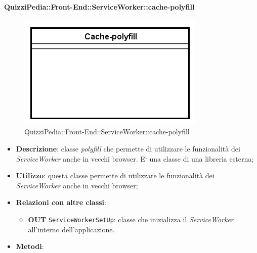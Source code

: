 \paragraph[QuizziPedia::Front-End::ServiceWorker::cache-polyfill]{QuizziPedia::Front-End::ServiceWorker::cache-polyfill}
\begin{figure} [ht]
	\centering
	\includegraphics[scale=0.80]{UML/Classi/Front-End/QuizziPedia_Front-End_ServiceWorker_cache-polyfill.png}
	\caption{QuizziPedia::Front-End::ServiceWorker::cache-polyfill}
\end{figure} \FloatBarrier
\begin{itemize}
	\item \textbf{Descrizione}: classe \textit{polyfill} che permette di utilizzare le funzionalità dei \textit{ServiceWorker} anche in vecchi browser. E` una classe di una libreria esterna;
	\item \textbf{Utilizzo}: questa classe permette di utilizzare le funzionalità dei \textit{ServiceWorker} anche in vecchi browser;
	\item \textbf{Relazioni con altre classi}:
	\begin{itemize}
		\item \textbf{OUT} \texttt{ServiceWorkerSetUp}: classe che inizializza il \textit{ServiceWorker} all'interno dell'applicazione.
	\end{itemize}
	\item \textbf{Metodi}:
\end{itemize}

